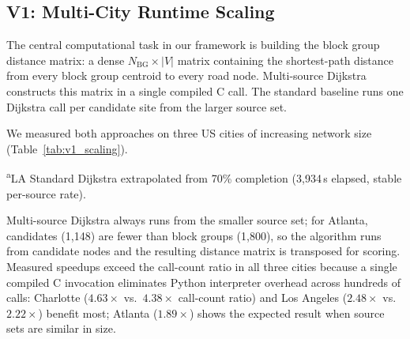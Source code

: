 \documentclass[conference]{IEEEtran}
\begin{document}
\subsection{V1: Multi-City Runtime Scaling}
\label{sec:v1}

The central computational task in our framework is building the block
group distance matrix: a dense $N_{\text{BG}} \times |V|$ matrix
containing the shortest-path distance from every block group centroid
to every road node.  Multi-source Dijkstra constructs this matrix in a
single compiled C call.  The standard baseline runs one Dijkstra call
per candidate site from the larger source set.

We measured both approaches on three US cities of increasing network
size (Table~\ref{tab:v1_scaling}).

\begin{table}[!t]
\centering
\caption{V1: Multi-City Runtime Scaling \& Speedup (HPC, 80\,GB RAM)}
\label{tab:v1_scaling}
\vspace{2pt}
\footnotesize\textsuperscript{a}LA Standard Dijkstra extrapolated from 70\% completion (3{,}934\,s elapsed, stable per-source rate).
\end{table}

Multi-source Dijkstra always runs from the smaller source set; for
Atlanta, candidates (1{,}148) are fewer than block groups (1{,}800), so
the algorithm runs from candidate nodes and the resulting distance
matrix is transposed for scoring.  Measured speedups exceed the
call-count ratio in all three cities because a single compiled C
invocation eliminates Python interpreter overhead across hundreds of
calls: Charlotte ($4.63\times$ vs.\ $4.38\times$ call-count ratio) and
Los Angeles ($2.48\times$ vs.\ $2.22\times$) benefit most; Atlanta
($1.89\times$) shows the expected result when source sets are similar in
size.
\end{document}

